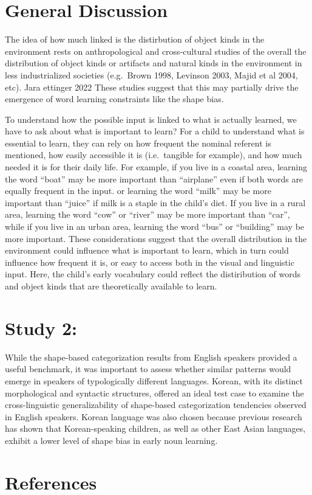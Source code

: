 \documentclass[
  american,
  man,floatsintext]{apa6}
\begin{document}
\section{General Discussion}\label{general-discussion}

The idea of how much linked is the distirbution of object kinds in the environment rests on anthropological and cross-cultural studies of the overall the distribution of object kinds or artifacts and natural kinds in the environment in less industrialized societies (e.g.~Brown 1998, Levinson 2003, Majid et al 2004, etc). Jara ettinger 2022 These studies suggest that this may partially drive the emergence of word learning constraints like the shape bias.

To understand how the possible input is linked to what is actually learned, we have to ask about what is important to learn? For a child to understand what is essential to learn, they can rely on how frequent the nominal referent is mentioned, how easily accessible it is (i.e.~tangible for example), and how much needed it is for their daily life. For example, if you live in a coastal area, learning the word ``boat'' may be more important than ``airplane'' even if both words are equally frequent in the input. or learning the word ``milk'' may be more important than ``juice'' if milk is a staple in the child's diet. If you live in a rural area, learning the word ``cow'' or ``river'' may be more important than ``car'', while if you live in an urban area, learning the word ``bus'' or ``building'' may be more important. These considerations suggest that the overall distribution in the environment could influence what is important to learn, which in turn could influence how frequent it is, or easy to access both in the visual and linguistic input. Here, the child's early vocabulary could reflect the distiribution of words and object kinds that are theoretically available to learn.

\section{Study 2:}\label{study-2}

While the shape-based categorization results from English speakers provided a useful benchmark, it was important to assess whether similar patterns would emerge in speakers of typologically different languages. Korean, with its distinct morphological and syntactic structures, offered an ideal test case to examine the cross-linguistic generalizability of shape-based categorization tendencies observed in English speakers. Korean language was also chosen because previous research has shown that Korean-speaking children, as well as other East Asian languages, exhibit a lower level of shape bias in early noun learning.

\newpage

\section{References}\label{references}

\protect{}\label{refs}
\end{document}
